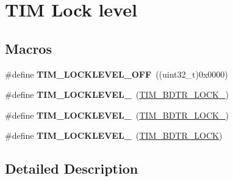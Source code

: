 \hypertarget{group___t_i_m___lock__level}{}\section{T\+IM Lock level}
\label{group___t_i_m___lock__level}
\subsection*{Macros}
\begin{DoxyCompactItemize}
\item 
\#define {\bfseries T\+I\+M\+\_\+\+L\+O\+C\+K\+L\+E\+V\+E\+L\+\_\+\+O\+FF}~((uint32\+\_\+t)0x0000)\hypertarget{group___t_i_m___lock__level_ga304aece56a9391a4d9b1016144d98fbd}{}\label{group___t_i_m___lock__level_ga304aece56a9391a4d9b1016144d98fbd}

\item 
\#define {\bfseries T\+I\+M\+\_\+\+L\+O\+C\+K\+L\+E\+V\+E\+L\+\_}~(\hyperlink{group___peripheral___registers___bits___definition_gabbd1736c8172e7cd098bb591264b07bf}{T\+I\+M\+\_\+\+B\+D\+T\+R\+\_\+\+L\+O\+C\+K\+\_})\hypertarget{group___t_i_m___lock__level_ga46dc7705788ba2ce5135c43b998ef4dd}{}\label{group___t_i_m___lock__level_ga46dc7705788ba2ce5135c43b998ef4dd}

\item 
\#define {\bfseries T\+I\+M\+\_\+\+L\+O\+C\+K\+L\+E\+V\+E\+L\+\_}~(\hyperlink{group___peripheral___registers___bits___definition_ga756df80ff8c34399435f52dca18e6eee}{T\+I\+M\+\_\+\+B\+D\+T\+R\+\_\+\+L\+O\+C\+K\+\_})\hypertarget{group___t_i_m___lock__level_ga03a5ed2aded43ccfe7ab12a9dd53d251}{}\label{group___t_i_m___lock__level_ga03a5ed2aded43ccfe7ab12a9dd53d251}

\item 
\#define {\bfseries T\+I\+M\+\_\+\+L\+O\+C\+K\+L\+E\+V\+E\+L\+\_}~(\hyperlink{group___peripheral___registers___bits___definition_ga7e4215d17f0548dfcf0b15fe4d0f4651}{T\+I\+M\+\_\+\+B\+D\+T\+R\+\_\+\+L\+O\+CK})\hypertarget{group___t_i_m___lock__level_gaa1afed375c27151608e388fdf4a57a13}{}\label{group___t_i_m___lock__level_gaa1afed375c27151608e388fdf4a57a13}

\end{DoxyCompactItemize}


\subsection{Detailed Description}
